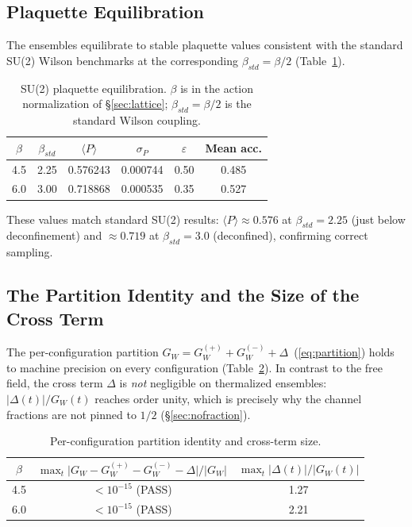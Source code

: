 \documentclass[12pt,a4paper]{article}
\newcommand{\GW}[1]{G_W^{(#1)}}
\def\mathrm#1{#1}%
\begin{document}
	\subsection{Plaquette Equilibration}
	
	The ensembles equilibrate to stable plaquette values consistent with the standard
	SU(2) Wilson benchmarks at the corresponding $\beta_{\mathrm{std}}=\beta/2$
	(Table~\ref{tab:plaquette}).
	
	\begin{table}[htbp]
		\centering
		\caption{SU(2) plaquette equilibration. $\beta$ is in the action normalization of
			\S\ref{sec:lattice}; $\beta_{\mathrm{std}}=\beta/2$ is the standard Wilson
			coupling.}
		\label{tab:plaquette}
		\begin{tabular}{cccccc}
			\toprule
			$\beta$ & $\beta_{\mathrm{std}}$ & $\langle P\rangle$ & $\sigma_P$ &
			$\varepsilon$ & Mean acc.\\
			\midrule
			4.5 & 2.25 & 0.576243 & 0.000744 & 0.50 & 0.485\\
			6.0 & 3.00 & 0.718868 & 0.000535 & 0.35 & 0.527\\
			\bottomrule
		\end{tabular}
	\end{table}
	
	\noindent These values match standard SU(2) results: $\langle P\rangle\approx0.576$
	at $\beta_{\mathrm{std}}=2.25$ (just below deconfinement) and $\approx0.719$ at
	$\beta_{\mathrm{std}}=3.0$ (deconfined), confirming correct sampling.
	
	\subsection{The Partition Identity and the Size of the Cross Term}
	
	The per-configuration partition $G_W=\GW{+}+\GW{-}+\Delta$~(\ref{eq:partition})
	holds to machine precision on every configuration (Table~\ref{tab:completeness}).
	In contrast to the free field, the cross term $\Delta$ is \emph{not} negligible on
	thermalized ensembles: $|\Delta(t)|/G_W(t)$ reaches order unity, which is precisely
	why the channel fractions are not pinned to $1/2$ (\S\ref{sec:nofraction}).
	
	\begin{table}[htbp]
		\centering
		\caption{Per-configuration partition identity and cross-term size.}
		\label{tab:completeness}
		\begin{tabular}{ccc}
			\toprule
			$\beta$ &
			$\max_t\bigl|G_W-\GW{+}-\GW{-}-\Delta\bigr|/|G_W|$ &
			$\max_t|\Delta(t)|/|G_W(t)|$\\
			\midrule
			4.5 & $<10^{-15}$ (PASS) & 1.27\\
			6.0 & $<10^{-15}$ (PASS) & 2.21\\
			\bottomrule
		\end{tabular}
	\end{table}
	
\end{document}

